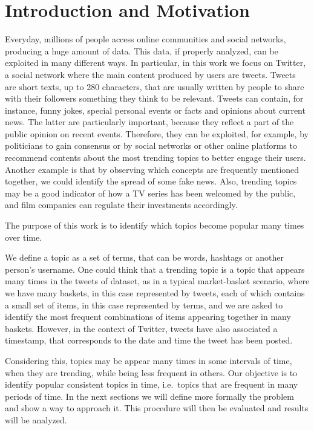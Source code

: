 \section{Introduction and Motivation}
\label{sec:intro}
Everyday, millions of people access online communities and social networks, producing 
a huge amount of data. This data, if properly analyzed, can be exploited in many different ways.
In particular, in this work we focus on Twitter, a social network where the main 
content produced by users are tweets. Tweets are short texts, up to 280 characters,
that are usually written by people to share with their followers something they think to be 
relevant. Tweets can contain, for instance, funny jokes, special personal events or facts
and opinions about current news. The latter are particularly important,
because they reflect a part of the public opinion on recent events.
Therefore, they can be exploited, for example, 
by politicians to gain consensus or by social networks or other online platforms to 
recommend contents about the most trending topics to better engage their users.
Another example is that by observing which concepts are frequently mentioned together, we could 
identify the spread of some fake news. Also, trending topics 
may be a good indicator of how a TV series has been welcomed by the public, and 
film companies can regulate their investments accordingly.

The purpose of this work is to identify which topics become popular many times 
over time.

We define a topic as a set of terms, that can be words, hashtags
or another person's username. 
One could think that a trending 
topic is a topic that appears many times in the tweets of dataset, as in a typical 
market-basket scenario, where we have many baskets, in this case represented by 
tweets, each of which contains a small set of items, in this case represented by terms,
and we are asked to identify the most frequent combinations of items appearing together 
in many baskets.
However, in the context of Twitter, tweets have also associated a timestamp, 
that corresponds to the date and time the tweet has been posted. 

Considering this, topics may be appear many times in some intervals of time, 
when they are trending, while being less frequent in others.  
Our objective is to identify popular consistent topics in time, i.e.\ topics that 
are frequent in many periods of time.
In the next sections we will define more formally the problem 
and show a way to approach it. This procedure will then be evaluated and results will 
be analyzed.



